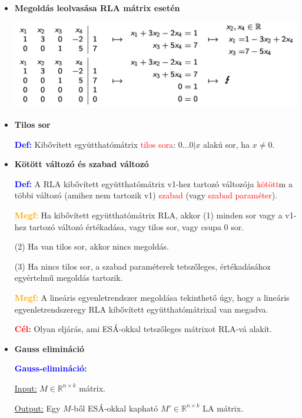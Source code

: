 \documentclass[../../szobeli.tex]{subfiles}
\begin{document}
\begin{itemize}
        \item \textbf{Megoldás leolvasása RLA mátrix esetén}
        
            \includegraphics[scale=0.38]{img/1.png}

        \item \textbf{Tilos sor}
        
            \textcolor{blue}{\textbf{Def:}} Kibővített együtthatómátrix \textcolor{red}{tilos sora}: $0 \dots 0 | x$ alakú sor, ha $x \neq 0$.

        \item \textbf{Kötött változó és szabad változó} 
        
            \textcolor{blue}{\textbf{Def:}} A RLA kibővített együtthatómátrix v1-hez tartozó változója \textcolor{red}{kötött}m a többi változó (amihez nem tartozik v1) \textcolor{red}{szabad} (vagy \textcolor{red}{szabad paraméter}). 

            \textcolor{orange}{\textbf{Megf:}} Ha kibővített együtthatómátrix RLA, akkor (1) minden sor vagy a v1-hez tartozó változó értékadása, vagy tilos sor, vagy csupa 0 sor.

            (2) Ha van tilos sor, akkor nincs megoldás. 

            (3) Ha nincs tilos sor, a szabad paraméterek tetszőleges, értékadásához egyértelmű megoldás tartozik.

            \textcolor{orange}{\textbf{Megf:}} A lineáris egyenletrendszer megoldása tekinthető úgy, hogy a lineáris egyenletrendszeregy RLA kibővített együtthatómátrixal van megadva.

            \textcolor{red}{\textbf{Cél:}} Olyan eljárás, ami ESÁ-okkal tetszőleges mátrixot RLA-vá alakít.

        \item \textbf{Gauss elimináció}
        
            \textcolor{blue}{\textbf{Gauss-elimináció:}} 
            
            \underline{Input:} $M \in \mathbb{R}^{n \times k}$ mátrix.

            \underline{Output:} Egy $M$-ből ESÁ-okkal kapható $M' \in \mathbb{R}^{n \times k}$ LA mátrix.


\end{itemize}
\end{document}
